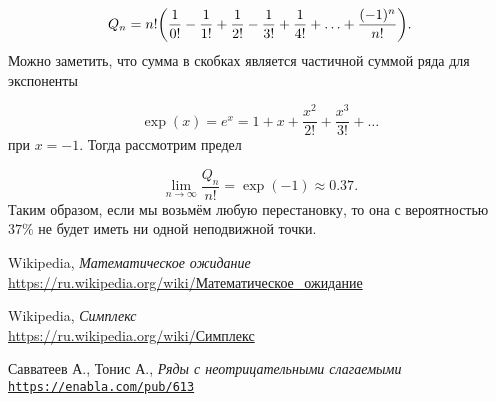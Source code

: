 \documentclass[12pt]{article}
\begin{document}
\begin{equation}
	Q_n = n!\qty(\dfrac{1}{0!} - \dfrac{1}{1!} + \dfrac{1}{2!} - \dfrac{1}{3!} + \dfrac{1}{4!} + \ldots + \dfrac{(-1)^n}{n!}).
\end{equation}
Можно заметить, что сумма в скобках является частичной суммой ряда для экспоненты 

\begin{equation}
	\exp(x) = e^x = 1 + x + \dfrac{x^2}{2!} + \dfrac{x^3}{3!} + \ldots
\end{equation}
при $x=-1$. Тогда рассмотрим предел 

\begin{equation}
	\lim_{n\rightarrow \infty} {\dfrac{Q_n}{n!}} = \exp(-1) \approx 0.37.
\end{equation}
Таким образом, если мы возьмём любую перестановку, то она с вероятностью $37\%$ не будет иметь ни одной неподвижной точки.

\begin{thebibliography}{9}
	Wikipedia, \textit{Математическое ожидание}
	\\\href{https://ru.wikipedia.org/wiki/\%D0\%9C\%D0\%B0\%D1\%82\%D0\%B5\%D0\%BC\%D0\%B0\%D1\%82\%D0\%B8\%D1\%87\%D0\%B5\%D1\%81\%D0\%BA\%D0\%BE\%D0\%B5\_\%D0\%BE\%D0\%B6\%D0\%B8\%D0\%B4\%D0\%B0\%D0\%BD\%D0\%B8\%D0\%B5}{https://ru.wikipedia.org/wiki/Математическое\_ожидание}

	Wikipedia, \textit{Симплекс}
	\\\href{https://ru.wikipedia.org/wiki/\%D0\%A1\%D0\%B8\%D0\%BC\%D0\%BF\%D0\%BB\%D0\%B5\%D0\%BA\%D1\%81}{https://ru.wikipedia.org/wiki/Симплекс}

	Савватеев А., Тонис А., \textit{Ряды с неотрицательными слагаемыми}
	\\\texttt{\url{https://enabla.com/pub/613}}
\end{thebibliography}
\end{document}
